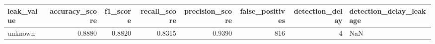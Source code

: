 \begin{tabular}{lrrrrrrl}
\toprule
leak\_value & accuracy\_score & f1\_score & recall\_score & precision\_score & false\_positives & detection\_delay & detection\_delay\_leakage \\
\midrule
unknown & 0.8880 & 0.8820 & 0.8315 & 0.9390 & 816 & 4 & NaN \\
\bottomrule
\end{tabular}
